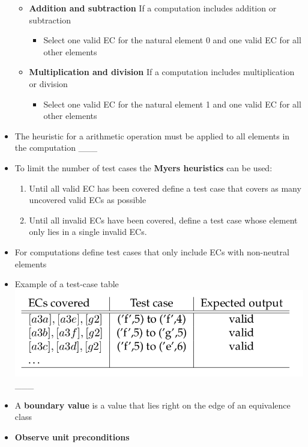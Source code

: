 \documentclass[11pt]{article}
\makeatletter
\def\maxwidth{\ifdim\Gin@nat@width>\linewidth\linewidth
    \else\Gin@nat@width\fi}
\let\Oldincludegraphics\includegraphics
\renewcommand{\includegraphics}[1]{\Oldincludegraphics[width=.8\maxwidth]{#1}}
\providecommand{\tightlist}{%
      \setlength{\itemsep}{0pt}\setlength{\parskip}{0pt}}
\makeatother
\begin{document}
\begin{itemize}
  \begin{itemize}
  \tightlist
  \item
    \textbf{Addition and subtraction} If a computation includes addition
    or subtraction

    \begin{itemize}
    \tightlist
    \item
      Select one valid EC for the natural element 0 and one valid EC for
      all other elements
    \end{itemize}
  \item
    \textbf{Multiplication and division} If a computation includes
    multiplication or division

    \begin{itemize}
    \tightlist
    \item
      Select one valid EC for the natural element 1 and one valid EC for
      all other elements
    \end{itemize}
  \end{itemize}
\item
  The heuristic for a arithmetic operation must be applied to all
  elements in the computation \_\_\_
\item
  To limit the number of test cases the \textbf{Myers heuristics} can be
  used:

  \begin{enumerate}
  \def\labelenumi{\arabic{enumi}.}
  \tightlist
  \item
    Until all valid EC has been covered define a test case that covers
    as many uncovered valid ECs as possible
  \item
    Until all invalid ECs have been covered, define a test case whose
    element only lies in a single invalid ECs.
  \end{enumerate}
\item
  For computations define test cases that only include ECs with
  non-neutral elements\\
\item
  Example of a test-case table \includegraphics{img/test_case_table.png}
  \_\_\_
\item
  A \textbf{boundary value} is a value that lies right on the edge of an
  equivalence class
\item
  \textbf{Observe unit preconditions}


\end{itemize}
\end{document}
